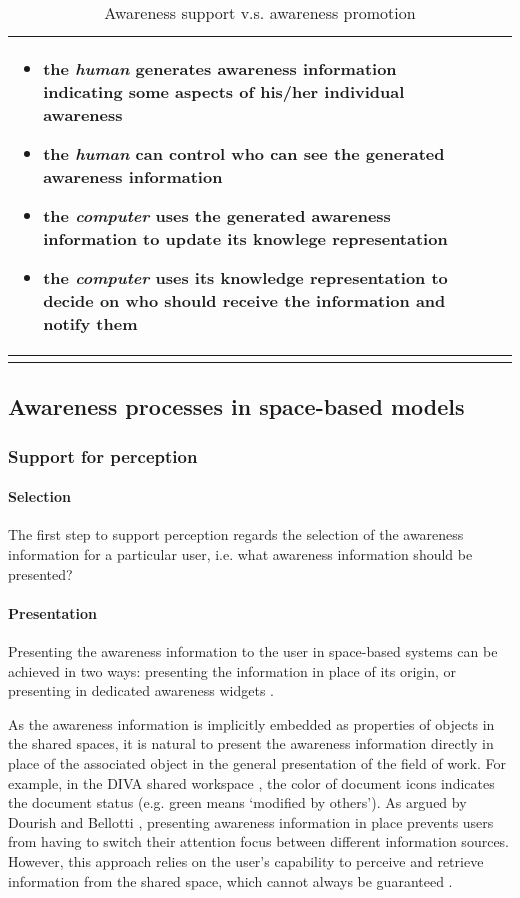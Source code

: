 {\begin{longtable}{>{\raggedright}p{1.1in}>{\raggedright}p{2.2in}>{\raggedright}p{2.2in}}
\begin{itemize}[nosep]
\item the \emph{human} generates awareness information indicating some aspects
of his/her individual awareness
\item the \emph{human} can control who can see the generated awareness information
\item the \emph{computer} uses the generated awareness information to update
its knowlege representation
\item the \emph{computer} uses its knowledge representation to decide on
who should receive the information and notify them\end{itemize}
\tabularnewline
\bottomrule
\caption{Awareness support v.s. awareness promotion}
\label{tab:awareness_support_vs_promotion}
\end{longtable}
}


\subsection{Awareness processes in space-based models} %
\label{sub:awareness_processes_in_space_based_models}
\subsubsection{Support for perception} %
\label{ssub:support_for_perception}

\paragraph*{Selection} %
\label{par:selection}
The first step to support perception regards the selection of the awareness information for a particular user, i.e. what awareness information should be presented? 



\paragraph*{Presentation} %
\label{par:presentation}
Presenting the awareness information to the user in space-based systems can be achieved in two ways: presenting the information in place of its origin, or presenting in dedicated awareness widgets \cite{Roseman1996}.

As the awareness information is implicitly embedded as properties of objects in the shared spaces, it is natural to present the awareness information directly in place of the associated object in the general presentation of the field of work. For example, in the DIVA shared workspace \cite{Berlage1999}, the color of document icons indicates the document status (e.g. green means `modified by others'). As argued by Dourish and Bellotti \cite{dourish1992awareness}, presenting awareness information in place prevents users from having to switch their attention focus between different information sources. However, this approach relies on the user's capability to perceive and retrieve information from the shared space, which cannot always be guaranteed \cite{Berlage1999}. 

